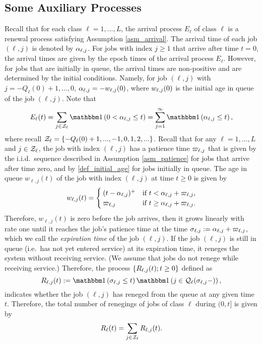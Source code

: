 \documentclass{article}
\theoremstyle{definition}
\numberwithin{equation}{section}
\begin{document}
\subsection{Some Auxiliary Processes}
Recall that for each class $\ell=1,...,L$, the arrival process $E_\ell$ of class $\ell$ is a renewal process satisfying Assumption \ref{asm_arrival}. The arrival time of each job $(\ell,j)$ is denoted by $\alpha_{\ell,j}$. For jobs with index $j\geq1$ that arrive after time $t=0$, the arrival times are given by the epoch times of the arrival process $E_\ell$. However, for jobs  that are initially in queue, the arrival times are non-positive and are determined by the initial conditions. Namely, for job $(\ell,j)$ with $j=-Q_\ell(0)+1,...,0$, $\alpha_{\ell,j}=-w_{\ell,j}(0)$, where $w_{\ell,j}(0)$ is the initial age in queue of the job $(\ell,j)$. Note that
\begin{equation}\label{arrival_rep}
\arrival_\ell(t)=\sum_{j\in\indexSet_\ell}\indic{0<\arrivaltime_{\ell,j}\leq t}=\sum_{j=1}^\infty \indic{\arrivaltime_{\ell,j}\leq t},
\end{equation}
where recall $\mathcal{Z}_\ell=\{-Q_\ell(0)+1,...,-1,0,1,2,...\}$. Recall that for any $\ell=1,...,L$ and $j\in\mathcal{Z}_\ell$, the job with index $(\ell,j)$ has a patience time $\varpi_{\ell,j}$ that is given by the i.i.d.\ sequence described in Assumption \ref{asm_patience} for jobs that arrive after time zero, and by \eqref{def_initial_age} for jobs initially in queue. The age in queue $w_{\ell,j}(t)$ of the job with index $(\ell,j)$ at time $t\geq0$ is given by
\begin{equation}\label{def_w}
w_{\ell,j}(t)=
  \begin{cases} (t-\alpha_{\ell,j})^+ & \text{if }  t<\alpha_{\ell,j}+\varpi_{\ell,j},\\
  \varpi_{\ell,j}& \text{if }t\geq \alpha_{\ell,j}+\varpi_{\ell,j}.
  \end{cases}
\end{equation}
Therefore, $w_{\ell,j}(t)$ is zero before the job arrives, then it grows linearly with rate one until it reaches the job's patience time at the time $\sigma_{\ell,j}:=\alpha_{\ell,j}+\varpi_{\ell,j}$, which we call the \textit{expiration time} of the job $(\ell,j)$. If the job $(\ell,j)$ is still in queue (i.e.\ has not yet entered service) at its expiration time, it reneges the system without receiving service. (We assume that jobs do not renege while receiving service.) Therefore, the process $\{R_{\ell,j}(t);t\geq0\}$ defined as
\begin{equation}\label{def_Rlj}
\reneg_{\ell,j}(t):=\indic{\renegtime_{\ell,j}\leq t}\indic{j\in\inque_\ell(\renegtime_{\ell,j}-)},
\end{equation}
indicates whether the job $(\ell,j)$  has reneged from the queue at any given time $t$. Therefore, the total number of renegings of jobs of class $\ell$  during $(0,t]$ is given by
\begin{equation}
  R_\ell(t) = \sum_{j\in\mathcal{Z}_\ell} R_{\ell,j}(t).
\end{equation}
\end{document}

